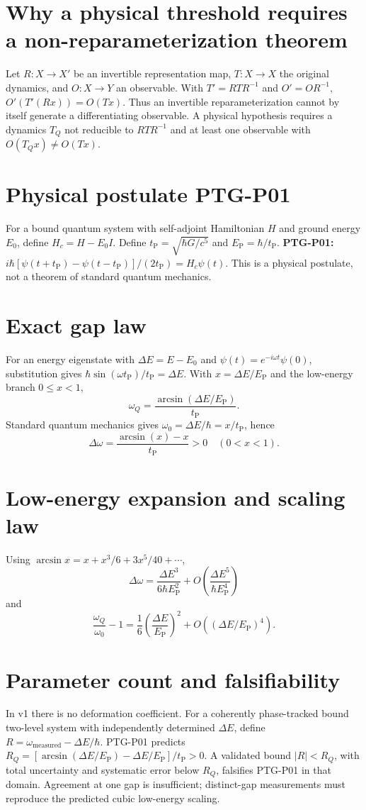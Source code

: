 \documentclass[11pt,a4paper]{article}
\newcommand{\tP}{t_{\mathrm P}}\newcommand{\EP}{E_{\mathrm P}}\newcommand{\dE}{\Delta E}\newcommand{\dw}{\Delta\omega}\newcommand{\repo}{\texttt{Goldkelch/qik-vrt}}
\begin{document}
\section{Why a physical threshold requires a non-reparameterization theorem}Let $R:X\to X'$ be an invertible representation map, $T:X\to X$ the original dynamics, and $O:X\to Y$ an observable. With $T'=RTR^{-1}$ and $O'=OR^{-1}$, $O'(T'(Rx))=O(Tx)$. Thus an invertible reparameterization cannot by itself generate a differentiating observable. A physical hypothesis requires a dynamics $T_Q$ not reducible to $RTR^{-1}$ and at least one observable with $O(T_Qx)\neq O(Tx)$.
\section{Physical postulate PTG-P01}For a bound quantum system with self-adjoint Hamiltonian $H$ and ground energy $E_0$, define $H_c=H-E_0I$. Define $\tP=\sqrt{\hbar G/c^5}$ and $\EP=\hbar/\tP$. \textbf{PTG-P01:} $i\hbar[\psi(t+\tP)-\psi(t-\tP)]/(2\tP)=H_c\psi(t)$. This is a physical postulate, not a theorem of standard quantum mechanics.
\section{Exact gap law}For an energy eigenstate with $\dE=E-E_0$ and $\psi(t)=e^{-i\omega t}\psi(0)$, substitution gives $\hbar\sin(\omega\tP)/\tP=\dE$. With $x=\dE/\EP$ and the low-energy branch $0\le x<1$, \[\boxed{\omega_Q=\frac{\arcsin(\dE/\EP)}{\tP}}.\] Standard quantum mechanics gives $\omega_0=\dE/\hbar=x/\tP$, hence \[\boxed{\dw=\frac{\arcsin(x)-x}{\tP}>0\quad(0<x<1).}\]
\section{Low-energy expansion and scaling law}Using $\arcsin x=x+x^3/6+3x^5/40+\cdots$, \[\boxed{\dw=\frac{\dE^3}{6\hbar\EP^2}+O\!\left(\frac{\dE^5}{\hbar\EP^4}\right)}\] and \[\boxed{\frac{\omega_Q}{\omega_0}-1=\frac16\left(\frac{\dE}{\EP}\right)^2+O\!\left((\dE/\EP)^4\right).}\]
\section{Parameter count and falsifiability}In v1 there is no deformation coefficient. For a coherently phase-tracked bound two-level system with independently determined $\dE$, define $R=\omega_{\mathrm{measured}}-\dE/\hbar$. PTG-P01 predicts $R_Q=[\arcsin(\dE/\EP)-\dE/\EP]/\tP>0$. A validated bound $|R|<R_Q$, with total uncertainty and systematic error below $R_Q$, falsifies PTG-P01 in that domain. Agreement at one gap is insufficient; distinct-gap measurements must reproduce the predicted cubic low-energy scaling.
\end{document}
